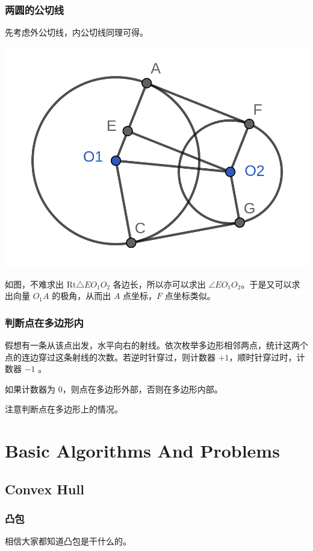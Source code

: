 \documentclass[10pt]{beamer}
\begin{document}
\begin{CJK}{UTF8}{gkai}
\begin{spacing}{1.2}
\begin{frame}
		\end{frame}
		\begin{frame}
			\frametitle{两圆的公切线}
			先考虑外公切线，内公切线同理可得。 \pause
			\begin{center}
			\includegraphics[scale=0.14]{../Pictures/Tangent_Line.png}
			\end{center}
			如图，不难求出 $\mathrm{Rt}\triangle EO_1O_2$ 各边长，所以亦可以求出 $\angle EO_1O_2$。于是又可以求出向量 $O_1A$ 的极角，从而出 $A$ 点坐标，$F$ 点坐标类似。

		\end{frame}
		\begin{frame}
			\frametitle{判断点在多边形内}

			假想有一条从该点出发，水平向右的射线。依次枚举多边形相邻两点，统计这两个点的连边穿过这条射线的次数。若逆时针穿过，则计数器 $+1$，顺时针穿过时，计数器 $-1$ 。 \pause

			如果计数器为 $0$，则点在多边形外部，否则在多边形内部。
			
			注意判断点在多边形上的情况。

		\end{frame}
		\section{Basic Algorithms And Problems}
		\subsection{Convex Hull}
		\begin{frame}
			\frametitle{凸包}

			相信大家都知道凸包是干什么的。 \pause


\end{frame}
\end{spacing}
\end{CJK}
\end{document}
